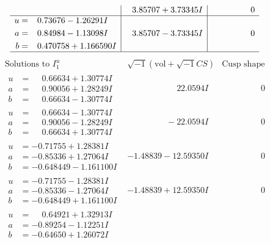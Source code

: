 \documentclass[1p]{elsarticle_modified}
\theoremstyle{definition}
\newcommand{\I}{\sqrt{-1}}
\begin{document}
$$\begin{array}{c|c|c}
 & \phantom{-}3.85707 + 3.73345 I & \phantom{-0.000000 } 0 \\ \hline\begin{aligned}
u &= \phantom{-}0.73676 - 1.26291 I \\
a &= \phantom{-}0.84984 - 1.13098 I \\
b &= \phantom{-}0.470758 + 1.166590 I\end{aligned}
 & \phantom{-}3.85707 - 3.73345 I & \phantom{-0.000000 } 0\\
 \hline 
 \end{array}$$\newpage$$\begin{array}{c|c|c}  
\text{Solutions to }I^u_{1}& \I (\text{vol} + \sqrt{-1}CS) & \text{Cusp shape}\\
 \hline 
\begin{aligned}
u &= \phantom{-}0.66634 + 1.30774 I \\
a &= \phantom{-}0.90056 + 1.28249 I \\
b &= \phantom{-}0.66634 - 1.30774 I\end{aligned}
 & \phantom{-0.000000 -}22.0594 I & \phantom{-0.000000 } 0 \\ \hline\begin{aligned}
u &= \phantom{-}0.66634 - 1.30774 I \\
a &= \phantom{-}0.90056 - 1.28249 I \\
b &= \phantom{-}0.66634 + 1.30774 I\end{aligned}
 & \phantom{-0.000000 } -22.0594 I & \phantom{-0.000000 } 0 \\ \hline\begin{aligned}
u &= -0.71755 + 1.28381 I \\
a &= -0.85336 + 1.27064 I \\
b &= -0.648449 - 1.161100 I\end{aligned}
 & -1.48839 - 12.59350 I & \phantom{-0.000000 } 0 \\ \hline\begin{aligned}
u &= -0.71755 - 1.28381 I \\
a &= -0.85336 - 1.27064 I \\
b &= -0.648449 + 1.161100 I\end{aligned}
 & -1.48839 + 12.59350 I & \phantom{-0.000000 } 0 \\ \hline\begin{aligned}
u &= \phantom{-}0.64921 + 1.32913 I \\
a &= -0.89254 - 1.12251 I \\
b &= -0.64650 + 1.26072 I\end{aligned}

\end{array}$$
\end{document}
